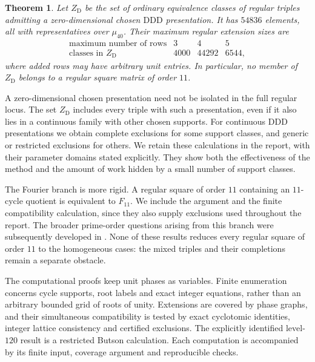 \documentclass[11pt,a4paper]{article}
\theoremstyle{plain}
\theoremstyle{definition}
\theoremstyle{plain}
\newtheorem{introtheorem}{Theorem}
\begin{document}
\par\addvspace{\medskipamount}\noindent
\begin{minipage}{\linewidth}
\begin{introtheorem}\label{intro:finite}
Let $Z_{\mathrm D}$ be the set of ordinary equivalence classes of regular triples admitting a zero-dimensional chosen $\mathrm{DDD}$ presentation. It has $54836$ elements, all with representatives over $\mu_{40}$. Their maximum regular extension sizes are
\[
\begin{array}{c|rrr}
\text{maximum number of rows}&3&4&5\\\hline
\text{classes in }Z_{\mathrm D}&4000&44292&6544,
\end{array}
\]
where added rows may have arbitrary unit entries. In particular, no member of $Z_{\mathrm D}$ belongs to a regular square matrix of order $11$.
\end{introtheorem}
\end{minipage}
\par\addvspace{\medskipamount}

A zero-dimensional chosen presentation need not be isolated in the full regular locus. The set $Z_{\mathrm D}$ includes every triple with such a presentation, even if it also lies in a continuous family with other chosen supports. For continuous $\mathrm{DDD}$ presentations we obtain complete exclusions for some support classes, and generic or restricted exclusions for others. We retain these calculations in the report, with their parameter domains stated explicitly. They show both the effectiveness of the method and the amount of work hidden by a small number of support classes.

The Fourier branch is more rigid. A regular square of order $11$ containing an $11$-cycle quotient is equivalent to $F_{11}$. We include the argument and the finite compatibility calculation, since they also supply exclusions used throughout the report. The broader prime-order questions arising from this branch were subsequently developed in \cite{prime}. None of these results reduces every regular square of order $11$ to the homogeneous cases: the mixed triples and their completions remain a separate obstacle.

The computational proofs keep unit phases as variables. Finite enumeration concerns cycle supports, root labels and exact integer equations, rather than an arbitrary bounded grid of roots of unity. Extensions are covered by phase graphs, and their simultaneous compatibility is tested by exact cyclotomic identities, integer lattice consistency and certified exclusions. The explicitly identified level-$120$ result is a restricted Butson calculation. Each computation is accompanied by its finite input, coverage argument and reproducible checks.
\end{document}
